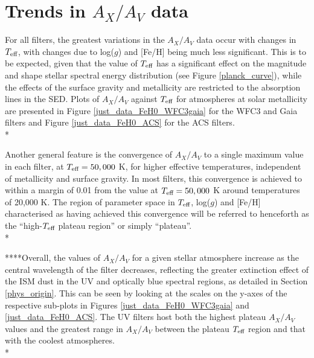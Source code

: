 \documentclass[12pt, a4paper]{report}
\begin{document}
\section{Trends in $A_{X}/A_{V}$ data}
For all filters, the greatest variations in the $A_{X}/A_{V}$ data occur with changes in $T_{\textnormal{eff}}$, with changes due to log($g$) and [Fe/H] being much less significant. This is to be expected, given that the value of $T_{\textnormal{eff}}$ has a significant effect on the magnitude and shape stellar spectral energy distribution (see Figure \ref{planck_curve}), while the effects of the surface gravity and metallicity are restricted to the absorption lines in the SED. Plots of $A_{X}/A_{V}$ against $T_{\textnormal{eff}}$ for atmospheres at solar metallicity are presented in Figure \ref{just_data_FeH0_WFC3gaia} for the WFC3 and Gaia filters and Figure \ref{just_data_FeH0_ACS} for the ACS filters. \\*

Another general feature is the convergence of $A_{X}/A_{V}$ to a single maximum value in each filter, at $T_{\textnormal{eff}} = 50,000$ K, for higher effective temperatures, independent of metallicity and surface gravity. In most filters, this convergence is achieved to within a margin of 0.01 from the value at $T_{\textnormal{eff}} = 50,000$ K around temperatures of 20,000 K. The region of parameter space in $T_{\textnormal{eff}}$, log($g$) and [Fe/H] characterised as having achieved this convergence will be referred to henceforth as the ``high-$T_{\textnormal{eff}}$ plateau region'' or simply ``plateau''.\\*

****Overall, the values of $A_{X}/A_{V}$ for a given stellar atmosphere increase as the central wavelength of the filter decreases, reflecting the greater extinction effect of the ISM dust in the UV and optically blue spectral regions, as detailed in Section \ref{phys_origin}. This can be seen by looking at the scales on the y-axes of the respective sub-plots in Figures \ref{just_data_FeH0_WFC3gaia} and \ref{just_data_FeH0_ACS}. The UV filters host both the highest plateau $A_{X}/A_{V}$ values and the greatest range in $A_{X}/A_{V}$ between the plateau $T_{\textnormal{eff}}$ region and that with the coolest atmospheres. \\*
\end{document}
